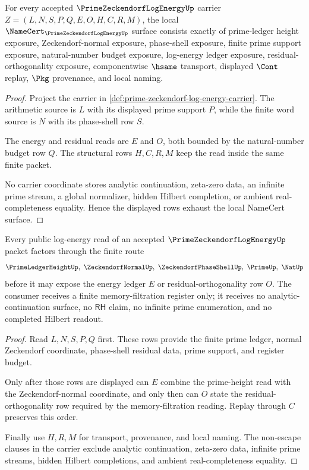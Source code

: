 \begin{theorem}
\label{thm:prime-zeckendorf-log-energy-namecert-obligations}
For every accepted $\PrimeZeckendorfLogEnergyUp$ carrier $Z=(L,N,S,P,Q,E,O,H,C,R,M)$, the local $\NameCert_{\PrimeZeckendorfLogEnergyUp}$ surface consists exactly of prime-ledger height exposure, Zeckendorf-normal exposure, phase-shell exposure, finite prime support exposure, natural-number budget exposure, log-energy ledger exposure, residual-orthogonality exposure, componentwise $\hsame$ transport, displayed $\Cont$ replay, $\Pkg$ provenance, and local naming.
\end{theorem}
\begin{proof}
Project the carrier in \autoref{def:prime-zeckendorf-log-energy-carrier}. The arithmetic source is $L$ with its displayed prime support $P$, while the finite word source is $N$ with its phase-shell row $S$.

The energy and residual reads are $E$ and $O$, both bounded by the natural-number budget row $Q$. The structural rows $H,C,R,M$ keep the read inside the same finite packet.

No carrier coordinate stores analytic continuation, zeta-zero data, an infinite prime stream, a global normalizer, hidden Hilbert completion, or ambient real-completeness equality. Hence the displayed rows exhaust the local NameCert surface.
\end{proof}

\begin{theorem}
\label{thm:prime-zeckendorf-log-energy-finite-register-route}
Every public log-energy read of an accepted $\PrimeZeckendorfLogEnergyUp$ packet factors through the finite route
$$
\PrimeLedgerHeightUp,\ \ZeckendorfNormalUp,\ \ZeckendorfPhaseShellUp,\ \PrimeUp,\ \NatUp
$$
before it may expose the energy ledger $E$ or residual-orthogonality row $O$. The consumer receives a finite memory-filtration register only; it receives no analytic-continuation surface, no $\mathsf{RH}$ claim, no infinite prime enumeration, and no completed Hilbert readout.
\end{theorem}
\begin{proof}
Read $L,N,S,P,Q$ first. These rows provide the finite prime ledger, normal Zeckendorf coordinate, phase-shell residual data, prime support, and register budget.

Only after those rows are displayed can $E$ combine the prime-height read with the Zeckendorf-normal coordinate, and only then can $O$ state the residual-orthogonality row required by the memory-filtration reading. Replay through $C$ preserves this order.

Finally use $H,R,M$ for transport, provenance, and local naming. The non-escape clauses in the carrier exclude analytic continuation, zeta-zero data, infinite prime streams, hidden Hilbert completions, and ambient real-completeness equality.
\end{proof}

